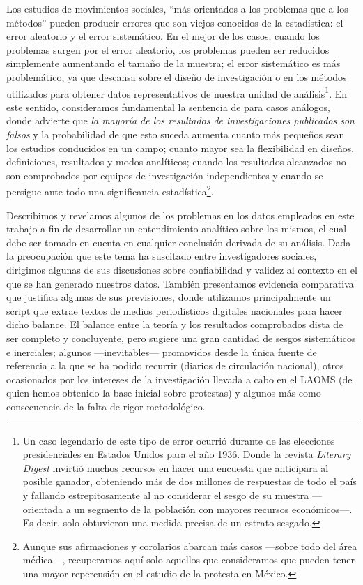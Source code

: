 \documentclass[letterpaper, 11pt]{book}
\theoremstyle{definition}
\theoremstyle{remark}
\begin{document}
Los estudios de movimientos sociales, ``más orientados a los problemas que a los métodos'' \citep[4]{2014_DellaPorta_Metodologicalpluralism} pueden producir errores que son viejos conocidos de la estadística: el error aleatorio y el error sistemático. En el mejor de los casos, cuando los problemas surgen por el error aleatorio, los problemas pueden ser reducidos simplemente aumentando el tamaño de la muestra; el error sistemático es más problemático, ya que descansa sobre el diseño de investigación o en los métodos utilizados para obtener datos representativos de nuestra unidad de análisis\footnote{
    Un caso legendario de este tipo de error ocurrió durante de las elecciones presidenciales en Estados Unidos para el año 1936. Donde la revista \emph{Literary Digest} invirtió muchos recursos en hacer una encuesta que anticipara al posible ganador, obteniendo más de dos millones de respuestas de todo el país y fallando estrepitosamente al no considerar el sesgo de su muestra ---orientada a un segmento de la población con mayores recursos económicos---. Es decir, solo obtuvieron una medida precisa de un estrato sesgado.
}.
En este sentido, consideramos fundamental la sentencia de \citet{2005_Ioannidis_FindingsAreFalse} para casos análogos, donde advierte que \emph{la mayoría de los resultados de investigaciones publicados son falsos} y la probabilidad de que esto suceda aumenta cuanto más pequeños sean los estudios conducidos en un campo; cuanto mayor sea la flexibilidad en diseños, definiciones, resultados y modos analíticos; cuando los resultados alcanzados no son comprobados por equipos de investigación independientes y cuando se persigue ante todo una significancia estadística\footnote{
	Aunque sus afirmaciones y corolarios abarcan más casos ---sobre todo del área médica---, recuperamos aquí solo aquellos que consideramos que pueden tener una mayor repercusión en el estudio de la protesta en México.
}.


Describimos y revelamos algunos de los problemas en los datos empleados en este trabajo a fin de desarrollar un entendimiento analítico sobre los mismos, el cual debe ser tomado en cuenta en cualquier conclusión derivada de su análisis. 
Dada la preocupación que este tema ha suscitado entre investigadores sociales, dirigimos algunas de sus discusiones sobre confiabilidad y validez al contexto en el que se han generado nuestros datos. 
También presentamos evidencia comparativa que justifica algunas de sus previsiones, donde utilizamos principalmente un script que extrae textos de medios periodísticos digitales nacionales para hacer dicho balance. 
El balance entre la teoría y los resultados comprobados dista de ser completo y concluyente, pero sugiere una gran cantidad de sesgos sistemáticos e inerciales; algunos ---inevitables--- promovidos desde la única fuente de referencia a la que se ha podido recurrir (diarios de circulación nacional), otros ocasionados por los intereses de la investigación llevada a cabo en el LAOMS (de quien hemos obtenido la base inicial sobre protestas) y algunos más como consecuencia de la falta de rigor metodológico.
\end{document}
